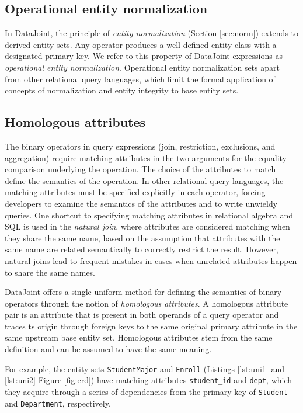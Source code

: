 \documentclass[letter,10pt]{article}
\newcommand{\datajoint}{DataJoint\xspace}
\begin{document}
\subsection{Operational entity normalization}\label{sec:operational}
In \datajoint, the principle of \emph{entity normalization} (Section \ref{sec:norm}) extends to derived entity sets.
Any operator produces a well-defined entity class with a designated primary key. 
We refer to this property of \datajoint expressions as \emph{operational entity normalization}. 
Operational entity normalization sets apart from other relational query languages, which limit the formal application of concepts of normalization and entity integrity to base entity sets.

\subsection{Homologous attributes}\label{sec:match}
The binary operators in query expressions (join, restriction,  exclusions, and aggregation) require matching attributes in the two arguments for the equality comparison underlying the operation. 
The choice of the attributes to match define the semantics of the operation. 
In other relational query languages, the matching attributes must be specified explicitly in each operator, forcing developers to examine the semantics of the attributes and to write unwieldy queries.
One shortcut to specifying matching attributes in relational algebra and SQL is used in the \emph{natural join}, where attributes are considered matching when they share the same name, based on the assumption that attributes with the same name are related semantically to correctly restrict the result.
However, natural joins lead to frequent mistakes in cases when unrelated attributes happen to share the same names.

\datajoint offers  a single uniform method for defining the semantics of binary operators through the notion of \emph{homologous attributes}.  
A homologous attribute pair is an attribute that is present in both operands of a query operator and traces ts origin through foreign keys to the same original primary attribute in the same upstream base entity set.
Homologous attributes stem from the same definition and can be assumed to have the same meaning. 

For example, the entity sets \lstinline$StudentMajor$ and \lstinline$Enroll$ (Listings \ref{lst:uni1} and \ref{lst:uni2} Figure \ref{fig:erd}) have matching attributes \lstinline$student_id$ and \lstinline$dept$, which they acquire through a series of dependencies from the primary key of \lstinline$Student$ and \lstinline$Department$, respectively.  
\end{document}
